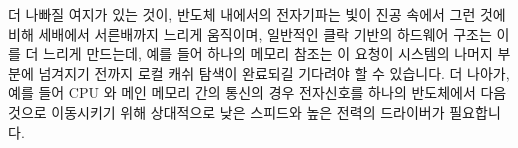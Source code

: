 \fi

더 나빠질 여지가 있는 것이, 반도체 내에서의 전자기파는 빛이 진공 속에서 그런
것에 비해 세배에서 서른배까지 느리게 움직이며, 일반적인 클락 기반의 하드웨어
구조는 이를 더 느리게 만드는데, 예를 들어 하나의 메모리 참조는 이 요청이
시스템의 나머지 부분에 넘겨지기 전까지 로컬 캐쉬 탐색이 완료되길 기다려야 할 수
있습니다.
더 나아가, 예를 들어 CPU 와 메인 메모리 간의 통신의 경우 전자신호를 하나의
반도체에서 다음 것으로 이동시키기 위해 상대적으로 낮은 스피드와 높은 전력의
드라이버가 필요합니다.

\iffalse

To make matters even worse, electric waves in silicon move from three to
thirty times more slowly than does light in a vacuum, and common
clocked logic constructs run still more slowly, for example, a
memory reference may need to wait for a local cache lookup to complete
before the request may be passed on to the rest of the system.
Furthermore, relatively low speed and high power drivers are required
to move electrical signals from one silicon die to another, for example,
to communicate between a CPU and main memory.

\fi

